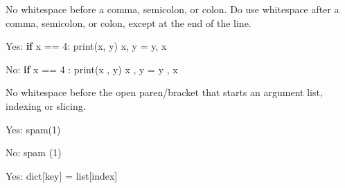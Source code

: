 \documentclass[
]{article}
\newenvironment{Shaded}{}{}
\newcommand{\BuiltInTok}[1]{\textcolor[rgb]{0.00,0.50,0.00}{#1}}
\newcommand{\ControlFlowTok}[1]{\textcolor[rgb]{0.00,0.44,0.13}{\textbf{#1}}}
\newcommand{\DecValTok}[1]{\textcolor[rgb]{0.25,0.63,0.44}{#1}}
\newcommand{\NormalTok}[1]{#1}
\newcommand{\OperatorTok}[1]{\textcolor[rgb]{0.40,0.40,0.40}{#1}}
\newcommand{\StringTok}[1]{\textcolor[rgb]{0.25,0.44,0.63}{#1}}
\begin{document}
No whitespace before a comma, semicolon, or colon. Do use whitespace
after a comma, semicolon, or colon, except at the end of the line.

\begin{samepage}
\begin{Shaded}
\begin{Highlighting}[]
\NormalTok{Yes: }\ControlFlowTok{if}\NormalTok{ x }\OperatorTok{==} \DecValTok{4}\NormalTok{:}
         \BuiltInTok{print}\NormalTok{(x, y)}
\NormalTok{     x, y }\OperatorTok{=}\NormalTok{ y, x}
\end{Highlighting}
\end{Shaded}
\end{samepage}

\begin{samepage}
\begin{Shaded}
\begin{Highlighting}[]
\NormalTok{No:  }\ControlFlowTok{if}\NormalTok{ x }\OperatorTok{==} \DecValTok{4}\NormalTok{ :}
         \BuiltInTok{print}\NormalTok{(x , y)}
\NormalTok{     x , y }\OperatorTok{=}\NormalTok{ y , x}
\end{Highlighting}
\end{Shaded}
\end{samepage}

No whitespace before the open paren/bracket that starts an argument
list, indexing or slicing.

\begin{samepage}
\begin{Shaded}
\begin{Highlighting}[]
\NormalTok{Yes: spam(}\DecValTok{1}\NormalTok{)}
\end{Highlighting}
\end{Shaded}
\end{samepage}

\begin{samepage}
\begin{Shaded}
\begin{Highlighting}[]
\NormalTok{No:  spam (}\DecValTok{1}\NormalTok{)}
\end{Highlighting}
\end{Shaded}
\end{samepage}

\begin{samepage}
\begin{Shaded}
\begin{Highlighting}[]
\NormalTok{Yes: }\BuiltInTok{dict}\NormalTok{[}\StringTok{\textquotesingle{}key\textquotesingle{}}\NormalTok{] }\OperatorTok{=} \BuiltInTok{list}\NormalTok{[index]}
\end{Highlighting}
\end{Shaded}
\end{samepage}
\end{document}
